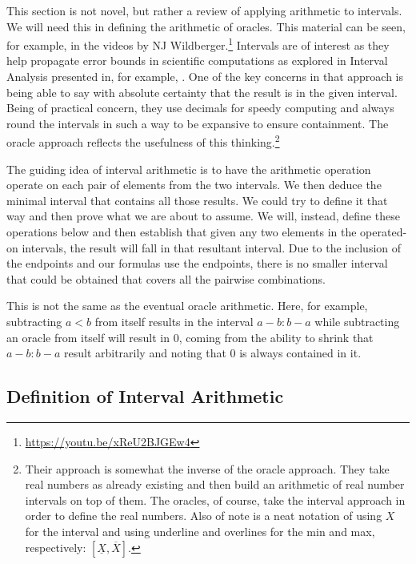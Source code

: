 \documentclass[12pt]{article}
\begin{document}
This section is not novel, but rather a review of applying arithmetic to intervals. We will need this in defining the arithmetic of oracles. This material can be seen, for example, in the videos by NJ Wildberger.\footnote{\url{https://youtu.be/xReU2BJGEw4}} Intervals are of interest as they help propagate error bounds in scientific computations as explored in Interval Analysis presented in, for example, \cite{moore}. One of the key concerns in that approach is being able to say with absolute certainty that the result is in the given interval. Being of practical concern, they use decimals for speedy computing and always round the intervals in such a way to be expansive to ensure containment. The oracle approach reflects the usefulness of this thinking.\footnote{Their approach is somewhat the inverse of the oracle approach. They take real numbers as already existing and then build an arithmetic of real number intervals on top of them. The oracles, of course, take the interval approach in order to define the real numbers. Also of note is a neat notation of using $X$ for the interval and using underline and overlines for the min and max, respectively: $[\underline X, \overline X]$.} 

The guiding idea of interval arithmetic is to have the arithmetic operation operate on each pair of elements from the two intervals. We then deduce the minimal interval that contains all those results. We could try to define it that way and then prove what we are about to assume. We will, instead, define these operations below and then establish that given any two elements in the operated-on intervals, the result will fall in that resultant interval. Due to the inclusion of the endpoints and our formulas use the endpoints, there is no smaller interval that could be obtained that covers all the pairwise combinations. 

This is not the same as the eventual oracle arithmetic. Here, for example, subtracting $a<b$ from itself results in the interval $a-b:b-a$ while subtracting an oracle from itself will result in $0$, coming from the ability to shrink that $a-b:b-a$ result arbitrarily and noting that $0$ is always contained in it. 

\subsection{Definition of Interval Arithmetic}
\end{document}
